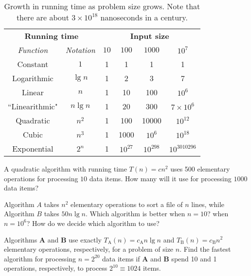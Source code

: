 \begin{table}[htb] 
   \centering
   \caption{Growth in running time as problem size grows. Note that 
   there are about $3\times 10^{18}$ nanoseconds in a century.}
   \label{t:growth}
   \begin{tabular}{|c|c|cccc|} \hline 
   \multicolumn{2}{|c|}{\textbf{Running time}} &  
   \multicolumn{4}{c|}{\textbf{Input size}} 
\\ \cline{1-6} 
   \emph{Function}     & \emph{Notation} & $10$ & $100$ & $1000$ & $10^7$
\\ \hline 
   Constant     & $1$      & 1  & 1  &   1 &   1 \\ \hline 
   Logarithmic  & $\lg n$ & 1  & 2& 3 & 7  \\ \hline 
   Linear       & $n$ & 1 & 10 & 100 & $10^6$   \\ \hline 
``Linearithmic" & $n  \lg n$ & 1 & 20 & 300 & $7\times 10^6$ \\ \hline 
   Quadratic    & $n^{2}$ & 1 & 100 & 10000 & $10^{12}$ \\ \hline 
   Cubic        & $n^{3}$ & 1 & 1000 & $10^6$ &  $10^{18}$ \\ \hline 
   Exponential  & $2^{n}$ & 1 & $10^{27}$ & $10^{298} $ & $10^{3010296}$  \\ \hline 
   \end{tabular}
\end{table} 
 



\begin{Boxample}[4]
\label{exr:time-compl:2}
A quadratic algorithm with running time \(T(n)=cn^2 \)
uses 500 elementary operations for processing $10$ data items. How many will it 
use for processing $1000$ data items? 
\end{Boxample}

\begin{Boxample}[4]
Algorithm $A$ takes $n^2$ elementary operations to sort a file of $n$ lines, while Algorithm $B$ takes $50n\lg n$. 
Which algorithm is better when $n = 10$? when $n=10^6$? How do we decide which algorithm to use?
\end{Boxample}

\begin{Boxample}[4]
\label{exr:time-compl:7A}
Algorithms \textbf{A} and \textbf{B} use exactly \(T_\mathrm{A}(n) = c_\mathrm{A} n \lg n\)
and \(T_\mathrm{B}(n) = c_\mathrm{B} n^{2}\) elementary operations, 
respectively, for a problem of size \(n\).
Find the fastest algorithm for processing \(n=2^{20}\) data items if
\textbf{A} and \textbf{B} spend 10 and 1 operations,
respectively, to process \(2^{10}\equiv 1024\) items.
\end{Boxample}


